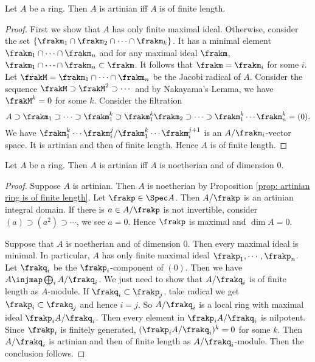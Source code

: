     \begin{proposition}\label{prop: artinian ring is of finite length}
        Let $A$ be a ring. 
        Then $A$ is artinian iff $A$ is of finite length.
    \end{proposition}
    \begin{proof}
        First we show that $A$ has only finite maximal ideal.
        Otherwise, consider the set $\{\frakm_1 \cap \frakm_2 \cap \cdots \cap \frakm_k\}$.
        It has a minimal element $\frakm_1 \cap \cdots \cap \frakm_n$ and for any maximal ideal $\frakm$, $\frakm_1 \cap \cdots \cap \frakm_n \subset \frakm$.
        It follows that $\frakm = \frakm_i$ for some $i$.
        Let $\frakM = \frakm_1 \cap \cdots \cap \frakm_n$ be the Jacobi radical of $A$.
        Consider the sequence $\frakM \supset \frakM^2 \supset \cdots$ and by Nakayama's Lemma, we have $\frakM^k = 0$ for some $k$.
        Consider the filtration 
        \[ A \supset \frakm_1 \supset \cdots \supset \frakm_1^k \supset \frakm_1^k\frakm_2 \supset \cdots \supset \frakm_1^k \cdots \frakm_n^k  = (0). \] 
        We have $\frakm_1^k\cdots\frakm_i^j/\frakm_1^k\cdots\frakm_i^{j+1}$ is an $A/\frakm_i$-vector space.
        It is artinian and then of finite length.
        Hence $A$ is of finite length.
    \end{proof}
    
    \begin{theorem}\label{thm: artinian ring is of codimension 0}
        Let $A$ be a ring. 
        Then $A$ is artinian iff $A$ is noetherian and of dimension $0$.
    \end{theorem}
    \begin{proof}
        Suppose $A$ is artinian.
        Then $A$ is noetherian by Proposition \ref{prop: artinian ring is of finite length}.
        Let $\frakp \in \Spec A$.
        Then $A/\frakp$ is an artinian integral domain.
        If there is $a\in A/\frakp$ is not invertible, consider $(a) \supset (a^2) \supset \cdots$, we see $a=0$.
        Hence $\frakp$ is maximal and $\dim A = 0$. 

        Suppose that $A$ is noetherian and of dimension $0$.
        Then every maximal ideal is minimal.
        In particular, $A$ has only finite maximal ideal $\frakp_1,\cdots,\frakp_n$.
        Let $\frakq_i$ be the $\frakp_i$-component of $(0)$.
        Then we have $A \injmap \bigoplus_i A/\frakq_i$.
        We just need to show that $A/\frakq_i$ is of finite length as $A$-module.
        If $\frakq_i \subset \frakp_j$, take radical we get $\frakp_i \subset \frakq_j$ and hence $i=j$.
        So $A/\frakq_i$ is a local ring with maximal ideal $\frakp_i A/\frakq_i$.
        Then every element in $\frakp_i A/\frakq_i$ is nilpotent.
        Since $\frakp_i$ is finitely generated, $(\frakp_i A/\frakq_i)^k = 0$ for some $k$.
        Then $A/\frakq_i$ is artinian and then of finite length as $A/\frakq_i$-module.
        Then the conclusion follows.
    \end{proof}


